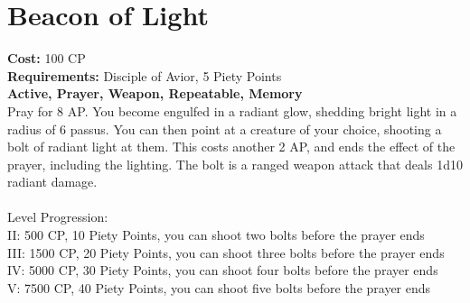 \section{Beacon of Light}
\textbf{Cost:} 100 CP\\
\textbf{Requirements:} Disciple of Avior, 5 Piety Points \\
\textbf{Active, Prayer, Weapon, Repeatable, Memory}\\
Pray for 8 AP. You become engulfed in a radiant glow, shedding bright light in a radius of 6 passus. You can then point at a creature of your choice, shooting a bolt of radiant light at them. This costs another 2 AP, and ends the effect of the prayer, including the lighting. The bolt is a ranged weapon attack that deals 1d10 radiant damage.\\
\\
Level Progression:\\
II: 500 CP, 10 Piety Points, you can shoot two bolts before the prayer ends\\
III: 1500 CP, 20 Piety Points, you can shoot three bolts before the prayer ends\\
IV: 5000 CP, 30 Piety Points, you can shoot four bolts before the prayer ends\\
V: 7500 CP, 40 Piety Points, you can shoot five bolts before the prayer ends\\
